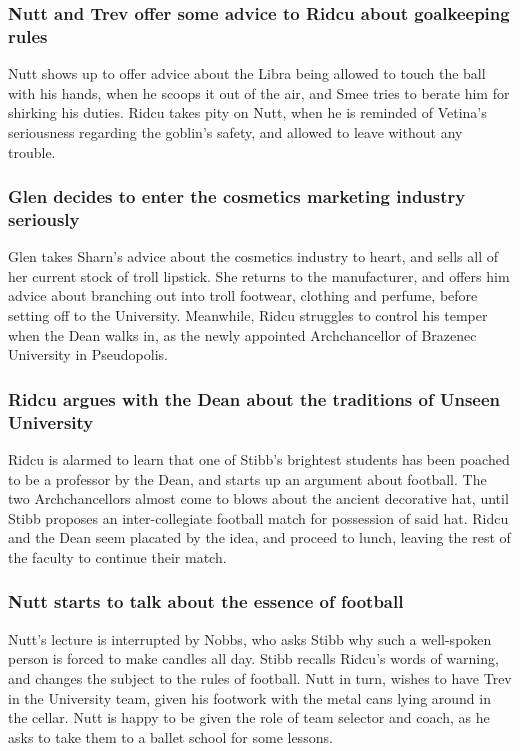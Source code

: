 \subsubsection{\Gls{Nutt} and \Gls{Trev} offer some advice to \Gls{Ridcu} about goalkeeping rules}
\Gls{Nutt} shows up to offer advice about the \Gls{Libra} being allowed to touch the ball with his
hands, when he scoops it out of the air, and \Gls{Smee} tries to berate him for shirking his duties.
\Gls{Ridcu} takes pity on \Gls{Nutt}, when he is reminded of \Gls{Vetina}'s seriousness regarding
the goblin's safety, and allowed to leave without any trouble.

\subsubsection{\Gls{Glen} decides to enter the cosmetics marketing industry seriously}
\Gls{Glen} takes \Gls{Sharn}'s advice about the cosmetics industry to heart, and sells all of her
current stock of troll lipstick. She returns to the manufacturer, and offers him advice about
branching out into troll footwear, clothing and perfume, before setting off to the University.
Meanwhile, \Gls{Ridcu} struggles to control his temper when the \Gls{Dean} walks in, as the newly
appointed Archchancellor of Brazenec University in Pseudopolis.

\subsubsection{\Gls{Ridcu} argues with the \Gls{Dean} about the traditions of Unseen University}
\Gls{Ridcu} is alarmed to learn that one of \Gls{Stibb}'s brightest students has been poached to be
a professor by the \Gls{Dean}, and starts up an argument about football. The two Archchancellors
almost come to blows about the ancient decorative hat, until \Gls{Stibb} proposes an
inter-collegiate football match for possession of said hat. \Gls{Ridcu} and the \Gls{Dean} seem
placated by the idea, and proceed to lunch, leaving the rest of the faculty to continue their match.

\subsubsection{\Gls{Nutt} starts to talk about the essence of football}
\Gls{Nutt}'s lecture is interrupted by \Gls{Nobbs}, who asks \Gls{Stibb} why such a well-spoken
person is forced to make candles all day. \Gls{Stibb} recalls \Gls{Ridcu}'s words of warning, and
changes the subject to the rules of football. \Gls{Nutt} in turn, wishes to have \Gls{Trev} in the
University team, given his footwork with the metal cans lying around in the cellar. \Gls{Nutt} is
happy to be given the role of team selector and coach, as he asks to take them to a ballet school
for some lessons.

